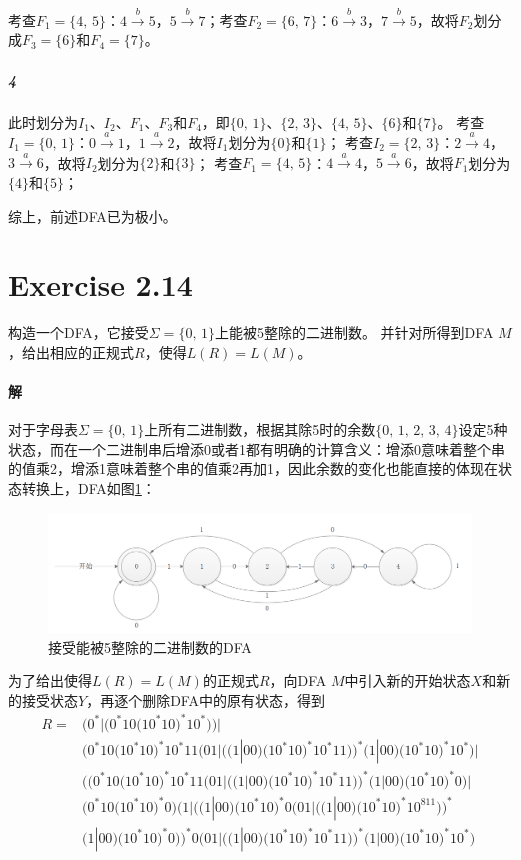 \documentclass{article}
\begin{document}
考查$F_1=\{4,\,5\}$：$4 \xrightarrow{b} 5$，$5 \xrightarrow{b} 7$；考查$F_2=\{6,\,7\}$：$6 \xrightarrow{b} 3$，$7 \xrightarrow{b} 5$，故将$F_2$划分成$F_3=\{6\}$和$F_4=\{7\}$。
\subparagraph{4}
此时划分为$I_1$、$I_2$、$F_1$、$F_3$和$F_4$，即$\{0,\,1\}$、$\{2,\,3\}$、$\{4,\,5\}$、$\{6\}$和$\{7\}$。
考查$I_1=\{0,\,1\}$：$0 \xrightarrow{a} 1$，$1 \xrightarrow{a} 2$，故将$I_1$划分为$\{0\}$和$\{1\}$；
考查$I_2=\{2,\,3\}$：$2 \xrightarrow{a} 4$，$3 \xrightarrow{a} 6$，故将$I_2$划分为$\{2\}$和$\{3\}$；
考查$F_1=\{4,\,5\}$：$4 \xrightarrow{a} 4$，$5 \xrightarrow{a} 6$，故将$F_1$划分为$\{4\}$和$\{5\}$；\par
综上，前述DFA已为极小。\\

\section{Exercise 2.14}
构造一个DFA，它接受$\Sigma=\{0,\,1\}$上能被5整除的二进制数。
并针对所得到DFA $M$，给出相应的正规式$R$，使得$L(R) = L(M)$。

\paragraph{解}
对于字母表$\Sigma=\{0,\,1\}$上所有二进制数，根据其除5时的余数$\{0,\,1,\,2,\,3,\,4\}$设定5种状态，而在一个二进制串后增添0或者1都有明确的计算含义：增添0意味着整个串的值乘2，增添1意味着整个串的值乘2再加1，因此余数的变化也能直接的体现在状态转换上，DFA如图\ref{fig:3}：\par
\begin{figure}
\centering
\includegraphics[scale=0.4]{DFA3.png}
\caption{接受能被5整除的二进制数的DFA}
\label{fig:3}
\end{figure}
为了给出使得$L(R) = L(M)$的正规式$R$，向DFA $M$中引入新的开始状态$X$和新的接受状态$Y$，再逐个删除DFA中的原有状态，得到
\begin{align*}
    R=&\bigg(0^*|\Big(0^*10\big(10^*10\big)^*10^*\Big)\bigg)\Bigg| \\
    &\Bigg(0^*10\big(10^*10\big)^*10^*11\bigg(01\bigg| \Big(\big(1|00\big)\big(10^*10\big)^*10^*11\Big)\bigg)^*\big(1|00\big)\big(10^*10\big)^*10^*\Bigg)\Bigg| \\
    &\Bigg(\bigg(0^*10\big(10^*10\big)^*10^*11\bigg(01|\Big(\big(1|00\big)\big(10^*10\big)^*10^*11\Big)\bigg)^*\big(1|00\big)\big(10^*10\big)^*0\bigg)\bigg| \\ &\Big(0^*10\big(10^*10\big)^*0\Big)\bigg(1\Big|\Big(\big(1|00\big)\big(10^*10\big)^*0\bigg(01\Big|\Big(\big(1|00\big)\big(10^*10\big)^*10^811\Big)\bigg)^* \\
    &\big(1|00\big)\big(10^*10\big)^*0\Big)\bigg)^*0\bigg(01\Big|\Big(\big(1|00\big)\big(10^*10\big)^*10^*11\Big)\bigg)^*\big(1|00\big)\big(10^*10\big)^*10^*\Bigg)
\end{align*}
\\
\end{document}
